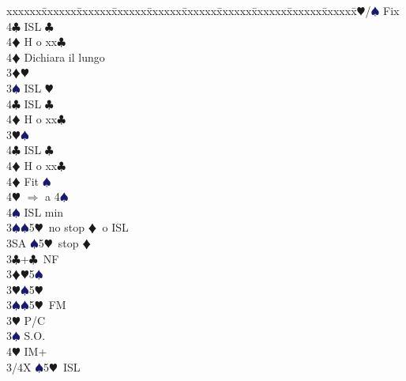 \documentclass[a4paper,italian]{article}
\newcommand{\BC}{\textcolor{OliveGreen}{$\clubsuit$}}
\newcommand{\BD}{\textcolor{RedOrange}{$\vardiamondsuit$}}
\newcommand{\BH}{\textcolor{Red2}{$\varheartsuit${}}}
\newcommand{\BS}{\textcolor{MidnightBlue}{$\spadesuit${}}}
\newenvironment{bidtable}
{\begin{tabbing}

    xxxxxx\=xxxxxx\=xxxxxx\=xxxxxx\=xxxxxx\=xxxxxx\=xxxxxx\=xxxxxx\=xxxxxx\=xxxxxx\=\kill}
{\end{tabbing} }%
\begin{document}
\begin{multicols}{2}
\begin{bidtable}
                                        3\BH/\BS \> Fix\\
                                        4\BC \> ISL \BC \+\\
                                        4\BD \> H o xx\BC \-\\
                                        4\BD \> Dichiara il lungo\-\\
                                        3\BD {}\BH \+\\
                                        3\BS \> ISL \BH \\
                                        4\BC \> ISL \BC \+\\
                                        4\BD \> H o xx\BC \-\-\\
                                        3\BH {}\BS \+\\
                                        4\BC \> ISL \BC \+\\
                                        4\BD \> H o xx\BC \-\\
                                        4\BD \> Fit \BS \+\\
                                        4\BH \> $\Rightarrow$ a 4\BS \+\\
                                        4\BS \> ISL min\-\-\-\\
                                        3\BS {}\BS 5\BH\ no stop \BD\ o ISL\\
                                        3SA \BS 5\BH\ stop \BD \-\\
                                        3\BC {}+\BC\ NF\+\\
                                        3\BD {}\BH 5\BS \\
                                        3\BH {}\BS 5\BH \\
                                        3\BS {}\BS 5\BH\ FM\-\\
                                        3\BH \> P/C\+\\
                                        3\BS \> S.O.\\
                                        4\BH \> IM+\\
                                        3/4X \BS 5\BH\ ISL\-\-
                                    \end{bidtable}


\end{multicols}
\end{document}
